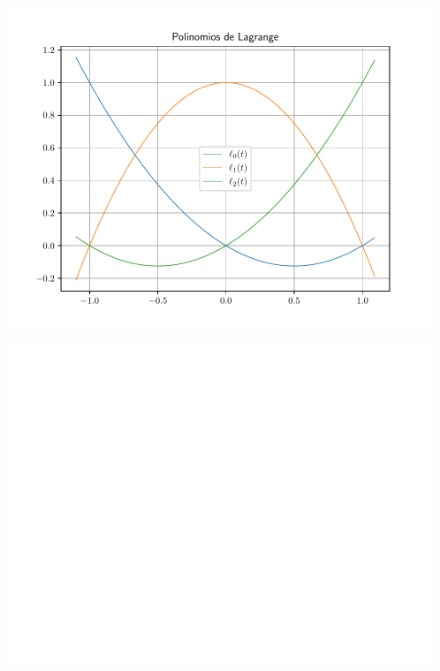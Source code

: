 \begin{frame}
	\begin{solution}
		\begin{figure}[ht!]
			\centering
			\includegraphics[width=.8\paperwidth]{p6_lagrange}
		\end{figure}
	\end{solution}
\end{frame}


\begin{frame}
	\begin{solution}
		\begin{figure}[ht!]
			\centering
			\includegraphics[width=.8\paperwidth]{p7}
		\end{figure}
	\end{solution}
\end{frame}